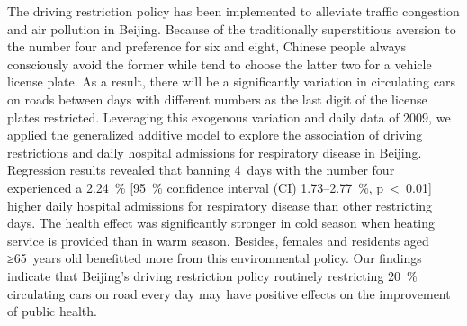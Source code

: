 The driving restriction policy has been implemented to alleviate traffic congestion and air pollution in Beijing. Because of the traditionally superstitious aversion to the number four and preference for six and eight, Chinese people always consciously avoid the former while tend to choose the latter two for a vehicle license plate. As a result, there will be a significantly variation in circulating cars on roads between days with different numbers as the last digit of the license plates restricted. Leveraging this exogenous variation and daily data of 2009, we applied the generalized additive model to explore the association of driving restrictions and daily hospital admissions for respiratory disease in Beijing. Regression results revealed that banning 4 days with the number four experienced a 2.24 {\%} [95 {\%} confidence interval (CI) 1.73--2.77 {\%}, p < 0.01] higher daily hospital admissions for respiratory disease than other restricting days. The health effect was significantly stronger in cold season when heating service is provided than in warm season. Besides, females and residents aged ≥65 years old benefitted more from this environmental policy. Our findings indicate that Beijing's driving restriction policy routinely restricting 20 {\%} circulating cars on road every day may have positive effects on the improvement of public health.